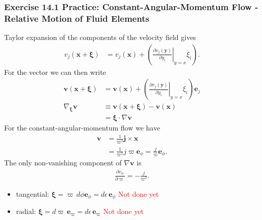 \documentclass[10pt,a4paper]{article}
\theoremstyle{definition}
\begin{document}
\subsubsection{Exercise 14.1 Practice: Constant-Angular-Momentum Flow - Relative Motion of Fluid Elements}
Taylor expansion of the components of the velocity field gives
\begin{align}
    v_j(\mathbf{x}+\boldsymbol\xi)
    &= v_j(\mathbf{x})+\left(\left.\frac{\partial v_j(\mathbf{y})}{\partial y_i}\right|_{y=x}\xi_i\right).
\end{align}
For the vector we can then write
\begin{align}
    \mathbf{v}(\mathbf{x}+\boldsymbol\xi)
    &= \mathbf{v}(\mathbf{x})+\left(\left.\frac{\partial v_j(\mathbf{y})}{\partial y_i}\right|_{y=x}\xi_i\right) \mathbf{e}_j\\
    \nabla_{\boldsymbol\xi}\mathbf{v}
    &\equiv\mathbf{v}(\mathbf{x}+\boldsymbol\xi) - \mathbf{v}(\mathbf{x})\\
    &=\boldsymbol\xi\cdot\nabla\mathbf{v}
\end{align}
For the constant-angular-momentum flow we have
\begin{align}
    \mathbf{v}&=\frac{1}{\varpi^2}\mathbf{j}\times\mathbf{x}\\
    &=\frac{1}{\varpi^2}j\varpi\mathbf{e}_\phi = \frac{j}{\varpi}\mathbf{e}_\phi.
\end{align}
The only non-vanishing component of $\nabla\mathbf{v}$ is
\begin{align}
    \frac{\partial v_\phi}{\partial \varpi}=-\frac{j}{\varpi^2}.
\end{align}

\begin{itemize}
    \item tangential: $\boldsymbol\xi=\varpi\, d\phi\mathbf{e}_\phi=d\epsilon\,\mathbf{e}_\phi$
    \textcolor{red}{Not done yet}
    \item radial: $\boldsymbol\xi=d\varpi\, \mathbf{e}_\varpi=d\epsilon\,\mathbf{e}_\varpi$
    \textcolor{red}{Not done yet}
\end{itemize}
\end{document}
